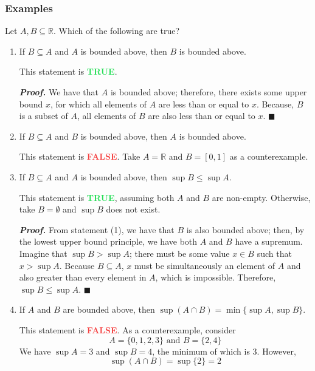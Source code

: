 \documentclass[11pt]{article}
\def\R{{\mathbb R}}
\newenvironment{solution}{\begin{tcolorbox}[colframe=_grey,colback=white,arc=0pt,outer arc=0pt]}{\end{tcolorbox}}
\newcommand{\true}{\textbf{\textcolor[HTML]{26de57}{TRUE}}}
\newcommand{\false}{\textbf{\textcolor[HTML]{f54242}{FALSE}}}
\newenvironment{proof}{\par\textit{\textbf{Proof.}}}{\hfill$\blacksquare$}
\begin{document}
\subsubsection{Examples}
Let $A,B\subseteq\R$. Which of the following are true?
\begin{enumerate}
    \item If $B\subseteq A$ and $A$ is bounded above, then $B$ is bounded above.
          \begin{solution}
              This statement is \true.
              \begin{proof}
                  We have that $A$ is bounded above; therefore, there exists some upper bound $x$, for which all elements of $A$ are less than or equal to $x$. Because, $B$ is a subset of $A$, all elements of $B$ are also less than or equal to $x$.
              \end{proof}
          \end{solution}
    \item If $B\subseteq A$ and $B$ is bounded above, then $A$ is bounded above.
          \begin{solution}
              This statement is \false. Take $A=\R$ and $B=[0,1]$ as a counterexample.
          \end{solution}
    \item If $B\subseteq A$ and $A$ is bounded above, then $\sup B\leq \sup A$.
          \begin{solution}
              This statement is \true, assuming both $A$ and $B$ are non-empty. Otherwise, take $B=\emptyset$ and $\sup B$ does not exist.
              \begin{proof}
                  From statement (1), we have that $B$ is also bounded above; then, by the lowest upper bound principle, we have both $A$ and $B$ have a supremum.
                  \\ Imagine that $\sup B>\sup A$; there must be some value $x\in B$ such that $x>\sup A$. Because $B\subseteq A$, $x$ must be simultaneously an element of $A$ and also greater than every element in $A$, which is impossible. Therefore, $\sup B \leq \sup A$.
              \end{proof}
          \end{solution}
    \item If $A$ and $B$ are bounded above, then $\sup(A\cap B)=\min\{\sup A,\sup B\}$.
          \begin{solution}
              This statement is \false. As a counterexample, consider
              $$A=\{0,1,2,3\}\text{ and }B=\{2,4\}$$
              We have $\sup A=3$ and $\sup B=4$, the minimum of which is $3$. However,
              $$
                  \sup(A\cap B)=\sup\{2\}=2
              $$
          \end{solution}
\end{enumerate}
\end{document}
